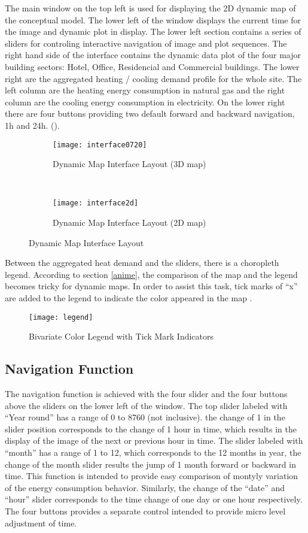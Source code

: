 The main window on the top left is used for displaying the 2D dynamic
map of the conceptual model. The lower left of the window displays the
current time for the image and dynamic plot in display. The lower left
section contains a series of sliders for controling interactive
navigation of image and plot sequences. The right hand side of the
interface contains the dynamic data plot of the four major building
sectors: Hotel, Office, Residencial and Commercial buildings. The
lower right are the aggregated heating / cooling demand profile for
the whole site. The left column are the heating energy consumption in
natural gas and the right column are the cooling energy consumption in
electricity. On the lower right there are four buttons providing two
default forward and backward navigation, 1h and
24h. ().
\begin{figure}[h!]
  \centering
  \begin{subfigure}{0.7\textwidth}
  \centering
  \texttt{[image: interface0720]}
  \caption{Dynamic Map Interface Layout (3D map)}
  \label{fig:interface0720}
\end{subfigure}
~
\begin{subfigure}{0.7\textwidth}
  \centering
  \texttt{[image: interface2d]}
  \caption{Dynamic Map Interface Layout (2D map)}
  \label{fig:interface2d}
\end{subfigure}
\caption{Dynamic Map Interface Layout}
\label{fig:interfaceLayout}
\end{figure}

Between the aggregated heat demand and the sliders, there is a
choropleth legend. According to section \ref{anime}, the comparison of
the map and the legend becomes tricky for dynamic maps. In order to
assist this task, tick marks of ``x'' are added to the legend to
indicate the color appeared in the map .
\begin{figure}[h!]
  \centering
  \texttt{[image: legend]}
  \caption{Bivariate Color Legend with Tick Mark Indicators}
  \label{fig:legend}
\end{figure}

\subsection {Navigation Function}
The navigation function is achieved with the four slider and the four
buttons above the sliders on the lower left of the window. The top
slider labeled with ``Year round'' has a range of 0 to 8760 (not
inclusive). the change of 1 in the slider position corresponds to the
change of 1 hour in time, which results in the display of the image of
the next or previous hour in time. The slider labeled with ``month''
has a range of 1 to 12, which corresponds to the 12 months in year,
the change of the month slider results the jump of 1 month forward or
backward in time. This function is intended to provide easy comparison
of montyly variation of the energy consumption behavior. Similarly,
the change of the ``date'' and ``hour'' slider corresponds to the time
change of one day or one hour respectively. The four buttons provides
a separate control intended to provide micro level adjustment of time.

